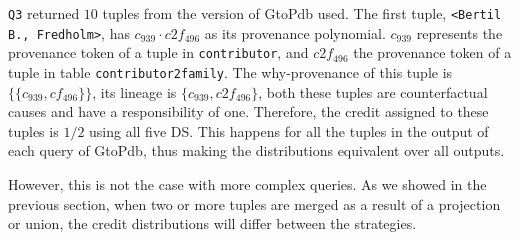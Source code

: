 \documentclass[preprint,12pt,sort&compress]{elsarticle}
\newcommand{\rtwo}[1]{\textcolor{reviewer2}{#1}}
\begin{document}
\texttt{Q3} returned $10$ tuples from the version of GtoPdb used. 
The first tuple, \texttt{<Bertil B., Fredholm>}, has  $c_{939} \cdot c2f_{496}$ as its provenance polynomial.
$c_{939}$ represents the provenance token of a tuple in \texttt{contributor}, and $c2f_{496}$ the provenance token of a tuple in table \texttt{contributor2family}. 
The why-provenance of this tuple is $\{\{c_{939}, cf_{496} \}\}$, its lineage is $\{c_{939}, c2f_{496} \}$, \rtwo{both these tuples are counterfactual causes and have a responsibility of one.}
Therefore, the credit assigned to these tuples is $1/2$ using all five DS.
This happens for all the tuples in the output of each query of GtoPdb, thus making the distributions equivalent over all outputs.

However, this is not the case with more complex queries. As we showed in the previous section, when two or more tuples are merged as a result of a projection or union, the credit distributions will differ between the strategies. %
\end{document}
